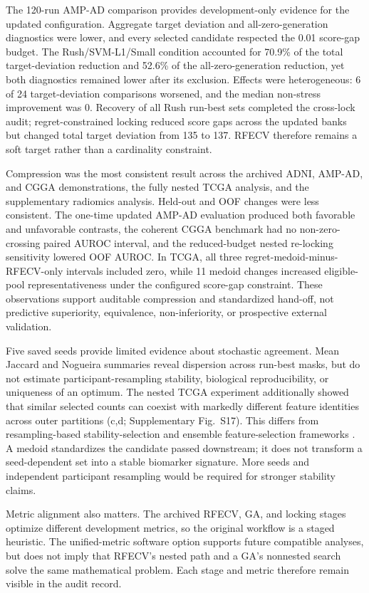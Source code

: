 The 120-run AMP-AD comparison provides development-only evidence for the updated configuration. Aggregate target deviation and all-zero-generation diagnostics were lower, and every selected candidate respected the 0.01 score-gap budget. The Rush/SVM-L1/Small condition accounted for 70.9\% of the total target-deviation reduction and 52.6\% of the all-zero-generation reduction, yet both diagnostics remained lower after its exclusion. Effects were heterogeneous: 6 of 24 target-deviation comparisons worsened, and the median non-stress improvement was 0. Recovery of all Rush run-best sets completed the cross-lock audit; regret-constrained locking reduced score gaps across the updated banks but changed total target deviation from 135 to 137. RFECV therefore remains a soft target rather than a cardinality constraint.

Compression was the most consistent result across the archived ADNI, AMP-AD, and CGGA demonstrations, the fully nested TCGA analysis, and the supplementary radiomics analysis. Held-out and OOF changes were less consistent. The one-time updated AMP-AD evaluation produced both favorable and unfavorable contrasts, the coherent CGGA benchmark had no non-zero-crossing paired AUROC interval, and the reduced-budget nested re-locking sensitivity lowered OOF AUROC. In TCGA, all three regret-medoid-minus-RFECV-only intervals included zero, while 11 medoid changes increased eligible-pool representativeness under the configured score-gap constraint. These observations support auditable compression and standardized hand-off, not predictive superiority, equivalence, non-inferiority, or prospective external validation.

Five saved seeds provide limited evidence about stochastic agreement. Mean Jaccard and Nogueira summaries reveal dispersion across run-best masks, but do not estimate participant-resampling stability, biological reproducibility, or uniqueness of an optimum. The nested TCGA experiment additionally showed that similar selected counts can coexist with markedly different feature identities across outer partitions (c,d; Supplementary Fig.~S17). This differs from resampling-based stability-selection and ensemble feature-selection frameworks \citep{ref09,ref40}. A medoid standardizes the candidate passed downstream; it does not transform a seed-dependent set into a stable biomarker signature. More seeds and independent participant resampling would be required for stronger stability claims.

Metric alignment also matters. The archived RFECV, GA, and locking stages optimize different development metrics, so the original workflow is a staged heuristic. The unified-metric software option supports future compatible analyses, but does not imply that RFECV's nested path and a GA's nonnested search solve the same mathematical problem. Each stage and metric therefore remain visible in the audit record.

